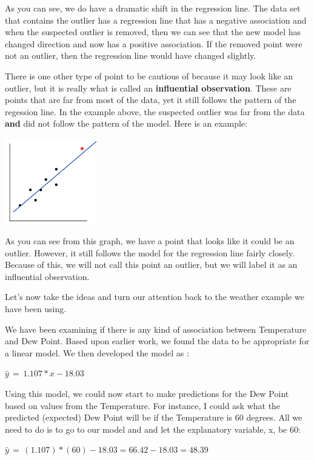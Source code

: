 \documentclass[
  letterpaper,
  DIV=11,
  numbers=noendperiod]{scrreprt}
\begin{document}
As you can see, we do have a dramatic shift in the regression line. The
data set that contains the outlier has a regression line that has a
negative association and when the suspected outlier is removed, then we
can see that the new model has changed direction and now has a positive
association. If the removed point were not an outlier, then the
regression line would have changed slightly.

There is one other type of point to be cautious of because it may look
like an outlier, but it is really what is called an \textbf{influential
observation}. These are points that are far from most of the data, yet
it still follows the pattern of the regession line. In the example
above, the suspected outlier was far from the data \textbf{and} did not
follow the pattern of the model. Here is an example:

\includegraphics[width=0.3\textwidth,height=\textheight]{./images/ROP_7.jpg}

As you can see from this graph, we have a point that looks like it could
be an outlier. However, it still follows the model for the regression
line fairly closely. Because of this, we will not call this point an
outlier, but we will label it as an influential observation.

Let's now take the ideas and turn our attention back to the weather
example we have been using.

We have been examining if there is any kind of association between
Temperature and Dew Point. Based upon earlier work, we found the data to
be appropriate for a linear model. We then developed the model as :

\(\hat{y} \, = \, 1.107*x - 18.03\)

Using this model, we could now start to make predictions for the Dew
Point based on values from the Temperature. For instance, I could ask
what the predicted (expected) Dew Point will be if the Temperature is 60
degrees. All we need to do is to go to our model and and let the
explanatory variable, x, be 60:

\(\hat{y} \, = \, (1.107)*(60) - 18.03 = 66.42 - 18.03 = 48.39\)
\end{document}
